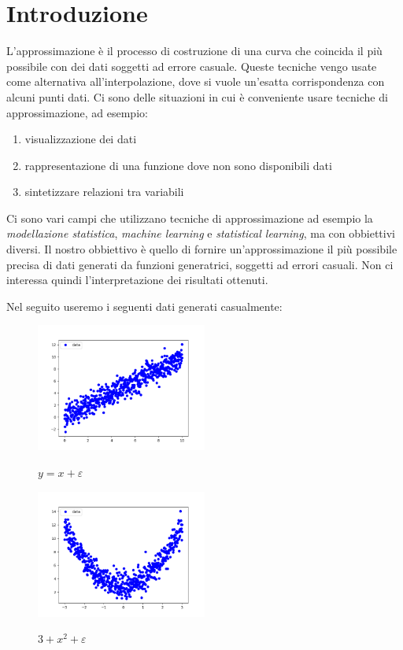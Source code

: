 \documentclass[../main.tex]{subfiles}
\begin{document}
\section{Introduzione}
L'approssimazione è il processo di costruzione di una curva che coincida il più possibile con dei  dati soggetti ad errore casuale.
Queste tecniche vengo usate come alternativa all'interpolazione, dove si vuole un'esatta corrispondenza con alcuni punti dati.
Ci sono delle situazioni in cui è conveniente usare tecniche di approssimazione, ad esempio:
\begin{enumerate}
    \item visualizzazione dei dati
    \item rappresentazione di una funzione dove non sono disponibili dati
    \item sintetizzare relazioni tra variabili
\end{enumerate}
Ci sono vari campi che utilizzano tecniche di approssimazione ad esempio la \textit{modellazione statistica}, \textit{machine learning} e 
\textit{statistical learning}, ma con obbiettivi diversi.
Il nostro obbiettivo è quello di fornire un'approssimazione il più possibile precisa di dati generati da funzioni generatrici, soggetti ad errori casuali.
Non ci interessa quindi l'interpretazione dei risultati ottenuti.

Nel seguito useremo i seguenti dati generati casualmente:


\begin{figure}[ht]
\caption{$y = x + \varepsilon$}
\includegraphics[width=0.5\textwidth]{Immagini/Introduzione/retta.png}
\centering
\label{fig:retta}
\end{figure}

\begin{figure}[ht]
\caption{$3 + x^2 + \varepsilon$}
\includegraphics[width=0.5\textwidth]{Immagini/Introduzione/parabola.png}
\centering
\label{fig:parabola}
\end{figure}
\end{document}
